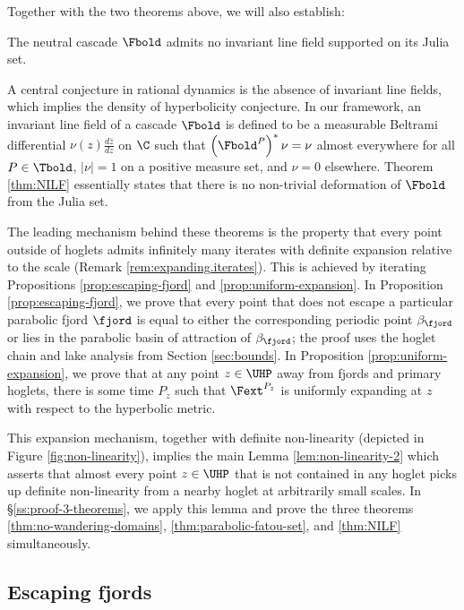 \documentclass{amsart}
\begin{document}
Together with the two theorems above, we will also establish:

\begin{theorem}[NILF]
\label{thm:NILF}
    The neutral cascade $\Fbold$ admits no invariant line field supported on its Julia set.
\end{theorem}

A central conjecture in rational dynamics is the absence of invariant line fields, which implies the density of hyperbolicity conjecture. 
In our framework, an invariant line field of a cascade $\Fbold$ is defined to be a measurable Beltrami differential $\nu(z) \frac{d \bar{z}}{dz}$ on $\C$ such that $\left(\Fbold^P\right)^*\nu=\nu$ almost everywhere for all $P \in \Tbold$, $|\nu|=1$ on a positive measure set, and $\nu=0$ elsewhere. 
Theorem \ref{thm:NILF} essentially states that there is no non-trivial deformation of $\Fbold$ from the Julia set.

The leading mechanism behind these theorems is the property that every point outside of hoglets admits infinitely many iterates with definite expansion relative to the scale (Remark \ref{rem:expanding.iterates}).
This is achieved by iterating Propositions \ref{prop:escaping-fjord} and \ref{prop:uniform-expansion}.
In Proposition \ref{prop:escaping-fjord}, we prove that every point that does not escape a particular parabolic fjord $\fjord$ is equal to either the corresponding periodic point $\beta_\fjord$ or lies in the parabolic basin of attraction of $\beta_\fjord$; the proof uses the hoglet chain and lake analysis from Section \ref{sec:bounds}.
In Proposition \ref{prop:uniform-expansion}, we prove that at any point $z \in \UHP$ away from fjords and primary hoglets, there is some time $P_z$ such that $\Fext^{P_z}$ is uniformly expanding at $z$ with respect to the hyperbolic metric.

This expansion mechanism, together with definite non-linearity (depicted in Figure \ref{fig:non-linearity}), implies the main Lemma \ref{lem:non-linearity-2} which asserts that almost every point $z \in \UHP$ that is not contained in any hoglet picks up definite non-linearity from a nearby hoglet at arbitrarily small scales.
In \S\ref{ss:proof-3-theorems}, we apply this lemma and prove the three theorems \ref{thm:no-wandering-domains}, \ref{thm:parabolic-fatou-set}, and \ref{thm:NILF} simultaneously.

\subsection{Escaping fjords}
\label{ss:parabolic-levels}
\end{document}
